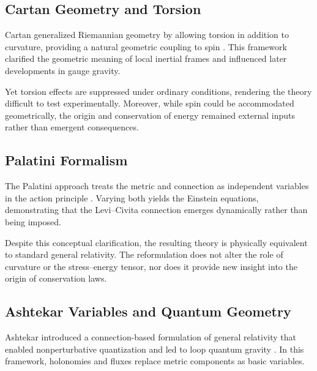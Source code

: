 \documentclass[%
 reprint,
 amsmath,amssymb,
 aps,
 prb,
]{revtex4-2}
\numberwithin{equation}{section}
\begin{document}
\subsection{Cartan Geometry and Torsion}
\label{sec:cartan}

Cartan generalized Riemannian geometry by allowing torsion in addition to curvature, providing a natural geometric coupling to spin \cite{Cartan1922}. This framework clarified the geometric meaning of local inertial frames and influenced later developments in gauge gravity.

Yet torsion effects are suppressed under ordinary conditions, rendering the theory difficult to test experimentally. Moreover, while spin could be accommodated geometrically, the origin and conservation of energy remained external inputs rather than emergent consequences.

\subsection{Palatini Formalism}
\label{sec:palatini}

The Palatini approach treats the metric and connection as independent variables in the action principle \cite{Palatini1919}. Varying both yields the Einstein equations, demonstrating that the Levi--Civita connection emerges dynamically rather than being imposed.

Despite this conceptual clarification, the resulting theory is physically equivalent to standard general relativity. The reformulation does not alter the role of curvature or the stress--energy tensor, nor does it provide new insight into the origin of conservation laws.

\subsection{Ashtekar Variables and Quantum Geometry}
\label{sec:ashtekar}

Ashtekar introduced a connection-based formulation of general relativity that enabled nonperturbative quantization and led to loop quantum gravity \cite{Ashtekar1986}. In this framework, holonomies and fluxes replace metric components as basic variables.
\end{document}
